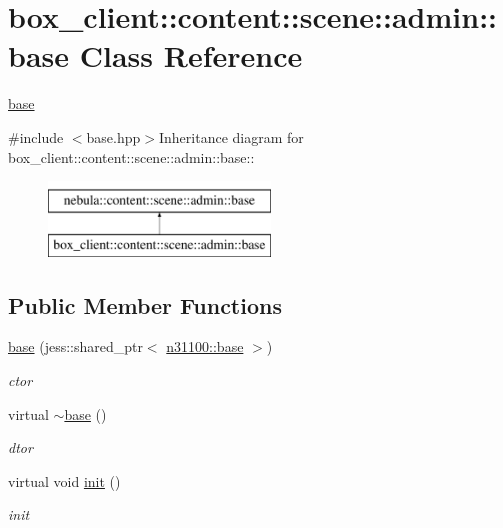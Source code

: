 \hypertarget{classbox__client_1_1content_1_1scene_1_1admin_1_1base}{
\section{box\_\-client::content::scene::admin::base Class Reference}
\label{classbox__client_1_1content_1_1scene_1_1admin_1_1base}
}


\hyperlink{classbox__client_1_1content_1_1scene_1_1admin_1_1base}{base}  


{\ttfamily \#include $<$base.hpp$>$}Inheritance diagram for box\_\-client::content::scene::admin::base::\begin{figure}[H]
\begin{center}
\leavevmode
\includegraphics[height=2cm]{classbox__client_1_1content_1_1scene_1_1admin_1_1base}
\end{center}
\end{figure}
\subsection*{Public Member Functions}
\begin{DoxyCompactItemize}
\item 
\hyperlink{classbox__client_1_1content_1_1scene_1_1admin_1_1base_a2cd92f663bf7384c9f9799f45b0b03c1}{base} (jess::shared\_\-ptr$<$ \hyperlink{classnebula_1_1content_1_1universe_1_1admin_1_1base}{n31100::base} $>$)
\begin{DoxyCompactList}\small\item\em ctor \item\end{DoxyCompactList}\item 
virtual \hyperlink{classbox__client_1_1content_1_1scene_1_1admin_1_1base_ac32a752d8ba5b54d06a3c5864d3c57f8}{$\sim$base} ()
\begin{DoxyCompactList}\small\item\em dtor \item\end{DoxyCompactList}\item 
virtual void \hyperlink{classbox__client_1_1content_1_1scene_1_1admin_1_1base_a9d0a4b10966e7b1be63a3fa83ef6bfec}{init} ()
\begin{DoxyCompactList}\small\item\em init \item\end{DoxyCompactList}\end{DoxyCompactItemize}
